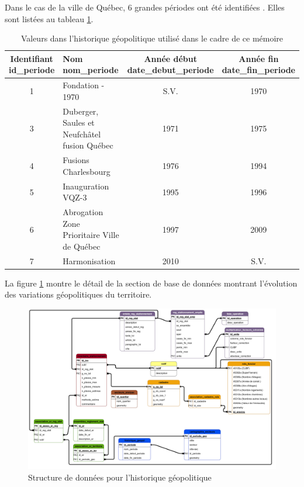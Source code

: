    \FloatBarrier \clearpage
    Dans le cas de la ville de Québec, 6 grandes périodes ont été identifiées \parencite{ville_de_quebec_reperes_nodate,elections_quebec_atlas_2021}. Elles sont listées au tableau \ref{tab:histo_geopol}.\par
    \begin{table}[h]
    \centering
    \begin{tabular}{c p{5cm} c c}
    \hline
    \makecell{Identifiant\\ id\_periode} & \makecell[l]{Nom \\ nom\_periode} & \makecell{Année début \\ date\_debut\_periode} & \makecell{Année fin \\ date\_fin\_periode}\\ \hline
    1 & Fondation - 1970 &  S.V. & 1970 \\
    3 & Duberger, Saules et Neufchâtel fusion Québec & 1971 & 1975 \\
    4 & Fusions Charlesbourg & 1976 & 1994 \\
    5 & Inauguration VQZ-3 & 1995 & 1996 \\
    6 & Abrogation Zone Prioritaire Ville de Québec & 1997 & 2009 \\
    7 & Harmonisation & 2010 & S.V.\\ \hline
    \end{tabular}
    \caption{Valeurs dans l'historique géopolitique utilisé dans le cadre de ce mémoire}\label{tab:histo_geopol}
    \end{table}
    La figure \ref{fig:offstreet_db_erd_history} montre le détail de la section de base de données montrant l'évolution des variations géopolitiques du territoire.
    \begin{figure}[h]
        \centering
        \includegraphics[trim={85cm 0 42.5cm 112.5cm}, clip, width=15cm]{dia/ERD_stationnement_propre.png}
        \caption{Structure de données pour l'historique géopolitique}\label{fig:offstreet_db_erd_history}
    \end{figure}
    \FloatBarrier
    

